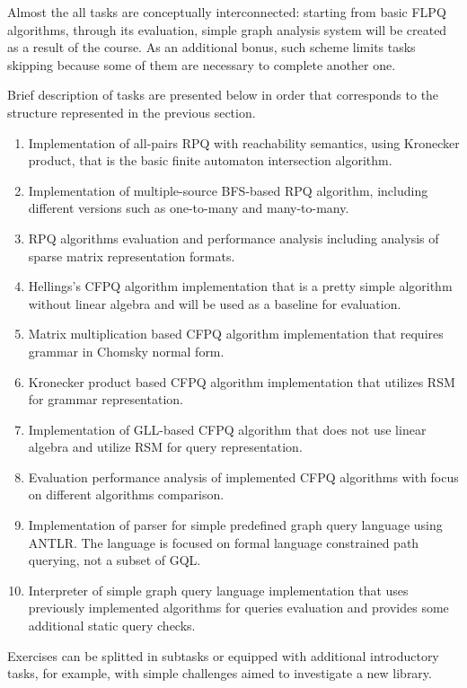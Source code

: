 \documentclass[sigconf]{acmart}
\begin{document}
Almost the all tasks are conceptually interconnected: starting from basic FLPQ algorithms, through its evaluation, simple graph analysis system will be created as a result of the course.
As an additional bonus, such scheme limits tasks skipping because some of them are necessary to complete another one.

Brief description of tasks are presented below in order that corresponds to the structure represented in the previous section.
\begin{enumerate}
  \item Implementation of all-pairs RPQ with reachability semantics, using Kronecker product, that is the basic finite automaton intersection algorithm.
  \item Implementation of multiple-source BFS-based RPQ algorithm, including different versions such as one-to-many and many-to-many.
  \item RPQ algorithms evaluation and performance analysis including analysis of sparse matrix representation formats.
  \item Hellings's CFPQ algorithm implementation that is a pretty simple algorithm without linear algebra and will be used as a baseline for evaluation. 
  \item Matrix multiplication based CFPQ algorithm implementation that requires grammar in Chomsky normal form.
  \item Kronecker product based CFPQ algorithm implementation that utilizes RSM for grammar representation.
  \item Implementation of GLL-based CFPQ algorithm that does not use linear algebra and utilize RSM for query representation. 
  \item Evaluation performance analysis of implemented CFPQ algorithms with focus on different algorithms comparison. 
  \item Implementation of parser for simple predefined graph query language using ANTLR. The language is focused on formal language constrained path querying, not a subset of GQL.
  \item Interpreter of simple graph query language implementation that uses previously implemented algorithms for queries evaluation and provides some additional static query checks.
\end{enumerate}

Exercises can be splitted in subtasks or equipped with additional introductory tasks, for example, with simple challenges aimed to investigate a new library.
\end{document}
